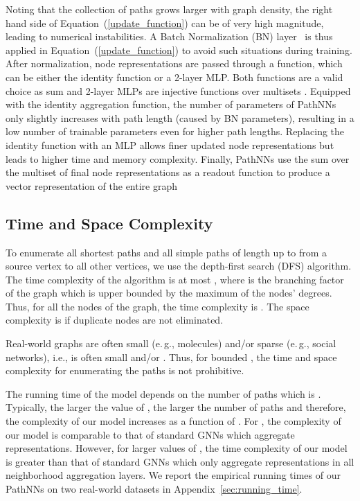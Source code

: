\documentclass{article}
\theoremstyle{plain}
\theoremstyle{definition}
\theoremstyle{remark}
\newcommand{\eg}{e.\,g., }
\begin{document}
Noting that the collection of paths  grows larger with graph density, the right hand side of Equation~(\ref{update_function}) can be of very high magnitude, leading to numerical instabilities. 
A Batch Normalization (BN) layer~\cite{ioffe2015batch} is thus applied in Equation~(\ref{update_function}) to avoid such situations during training. 
After normalization, node representations are passed through a  function, which can be either the identity function or a 2-layer MLP. 
Both functions are a valid choice as sum and 2-layer MLPs are injective functions over multisets \cite{xu2019powerful}. 
Equipped with the identity aggregation function, the number of parameters of PathNNs only slightly increases with path length (caused by BN parameters), resulting in a low number of trainable parameters even for higher path lengths. 
Replacing the identity function with an MLP allows finer updated node representations but leads to higher time and memory complexity. 
Finally, PathNNs use the sum over the multiset of final node representations as a readout function to produce a vector representation of the entire graph 


\subsection{Time and Space Complexity}
To enumerate all shortest paths and all simple paths of length up to  from a source vertex to all other vertices, we use the depth-first search (DFS) algorithm.
The time complexity of the algorithm is at most , where  is the branching factor of the graph which is upper bounded by the maximum of the nodes' degrees.
Thus, for all the nodes of the graph, the time complexity is .
The space complexity is  if duplicate nodes are not eliminated.

Real-world graphs are often small (\eg molecules) and/or sparse (\eg social networks), i.e.,  is often small and/or .
Thus, for bounded , the time and space complexity for enumerating the paths is not prohibitive.

The running time of the model depends on the number of paths which is .
Typically, the larger the value of , the larger the number of paths and therefore, the complexity of our model increases as a function of .
For , the complexity of our model is comparable to that of standard GNNs which aggregate  representations.
However, for larger values of , the time complexity of our model is greater than that of standard GNNs which only aggregate  representations in all neighborhood aggregation layers.
We report the empirical running times of our PathNNs on two real-world datasets in Appendix~\ref{sec:running_time}.
\end{document}
